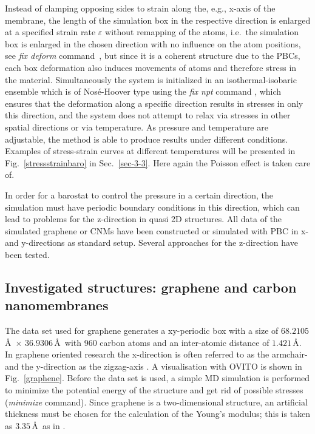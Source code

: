 \documentclass[preprint,12pt]{elsarticle}
\newcommand{\figref}[1]{Fig.~\protect\ref{#1}}
\begin{document}
Instead of clamping opposing sides to strain along the, e.g., x-axis of the membrane, 
the length of the simulation box in the respective direction is enlarged 
at a specified strain rate 
$\varepsilon$ without remapping of the atoms, i.e.\ the simulation box is 
enlarged in the chosen direction with no influence on the atom positions, 
see \textit{fix deform} command~\cite{LAMMPS:DOC}, but since it is 
a coherent structure due to the PBCs, each box deformation also 
induces movements of atoms and therefore stress in the material. 
Simultaneously the system is initialized in an isothermal-isobaric ensemble which is 
of Nos{\'{e}}-Hoover type using the 
\textit{fix npt} command \cite{LAMMPS:DOC}, which ensures that the deformation along a specific 
direction results in stresses in only this direction, and the system does not attempt 
to relax via stresses in other spatial directions or via temperature. 
As pressure and temperature are adjustable, the method is able to produce results under different conditions. Examples of stress-strain curves at different temperatures will be presented in 
\figref{stressstrainbaro} in Sec.~\ref{sec-3-3}. 
Here again the Poisson effect is taken care of.

In order for a barostat to control the pressure in a certain direction, 
the simulation must have periodic boundary conditions in this direction, 
which can lead to problems for the z-direction in quasi 2D structures.
All data of the simulated graphene or CNMs have been 
constructed or simulated with PBC in x- and y-directions as standard setup. 
Several approaches for the z-direction have been tested.



\subsection{Investigated structures: graphene and carbon nanomembranes}
\label{structures}

The data set used for graphene generates a xy-periodic box with a size 
of $68.2105$\,\AA\,  $\times$ $36.9306$\,\AA\,  with 960 carbon atoms and an 
inter-atomic distance of $1.421$\,\AA. 
In graphene oriented research the x-direction is often referred to as the armchair- 
and the y-direction as the zigzag-axis \cite{STC:LDSS13}.
A visualisation with OVITO \cite{ovito} is shown in \figref{graphene}. 
Before the data set is used, a simple MD simulation is performed to minimize 
the potential energy of the structure and get rid of possible stresses (\textit{minimize} command). 
Since graphene is a two-dimensional structure, an artificial thickness must be 
chosen for the calculation of the Young's modulus; this is taken 
as $3.35$\,\AA\
as in \cite{GEH:PE18}.
\end{document}
